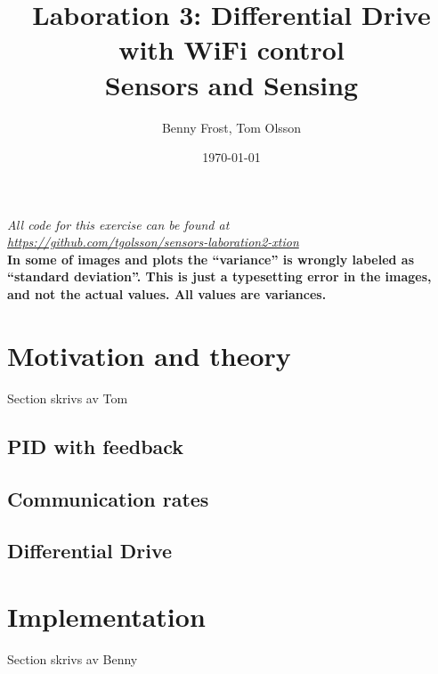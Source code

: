 \documentclass[11pt]{article}
\title{Laboration 3: Differential Drive with WiFi control\\ {\small Sensors and Sensing}} \author{Benny Frost, Tom Olsson}
\date{\today}
\begin{document}
\maketitle %
\begin{center}
  \emph{All code for this exercise can be found at \\ \url{https://github.com/tgolsson/sensors-laboration2-xtion}} \\ \vspace{10pt}
  \textbf{\Large In some of images and plots the ``variance'' is wrongly labeled as
    ``standard deviation''. This is just a typesetting error in the images, and
    not the actual values. All values are variances.}
\end{center}
\tableofcontents
\lstlistoflistings %
\listoffigures %
\listoftables \lstset{
  matchrangestart=t} %


\section{Motivation and theory}
Section skrivs av Tom
\subsection{PID with feedback}
\subsection{Communication rates}
\label{subsec:cr}
\subsection{Differential Drive}

\section{Implementation}
Section skrivs av Benny
\end{document}
